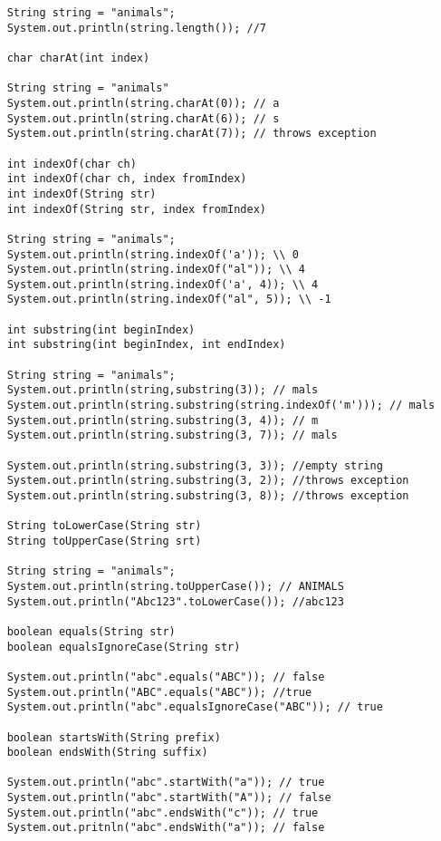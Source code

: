 \documentclass[a4paper]{report}   %
\begin{document}
\begin{lstlisting}
	String string = "animals";
	System.out.println(string.length()); //7
	
	char charAt(int index)
	
	String string = "animals"
	System.out.println(string.charAt(0)); // a
	System.out.println(string.charAt(6)); // s
	System.out.println(string.charAt(7)); // throws exception
	
	int indexOf(char ch)
	int indexOf(char ch, index fromIndex)
	int indexOf(String str)
	int indexOf(String str, index fromIndex)
	
	String string = "animals";
	System.out.println(string.indexOf('a')); \\ 0 
	System.out.println(string.indexOf("al")); \\ 4
	System.out.println(string.indexOf('a', 4)); \\ 4
	System.out.println(string.indexOf("al", 5)); \\ -1
	
	int substring(int beginIndex)
	int substring(int beginIndex, int endIndex)
	
	String string = "animals";
	System.out.println(string,substring(3)); // mals
	System.out.println(string.substring(string.indexOf('m'))); // mals
	System.out.println(string.substring(3, 4)); // m
	System.out.println(string.substring(3, 7)); // mals
	
	System.out.println(string.substring(3, 3)); //empty string
	System.out.println(string.substring(3, 2)); //throws exception
	System.out.println(string.substring(3, 8)); //throws exception
	
	String toLowerCase(String str)
	String toUpperCase(String srt)
	
	String string = "animals";
	System.out.println(string.toUpperCase()); // ANIMALS
	System.out.println("Abc123".toLowerCase()); //abc123
	
	boolean equals(String str)
	boolean equalsIgnoreCase(String str)
	
	System.out.println("abc".equals("ABC")); // false
	System.out.println("ABC".equals("ABC")); //true
	System.out.println("abc".equalsIgnoreCase("ABC")); // true

	boolean startsWith(String prefix)
	boolean endsWith(String suffix)
	
	System.out.println("abc".startWith("a")); // true
	System.out.println("abc".startWith("A")); // false
	System.out.println("abc".endsWith("c")); // true
	System.out.pritnln("abc".endsWith("a")); // false


\end{lstlisting}
\end{document}
